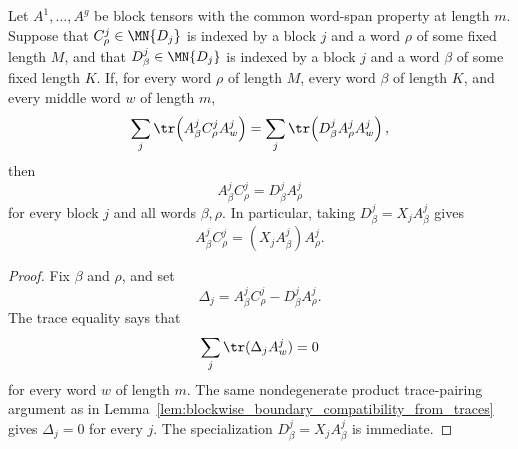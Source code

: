 \begin{lemma}
    \label{lem:blockwise_word_boundary_compatibility_from_traces}
    \leanok
    Let $A^1,\ldots,A^g$ be block tensors with the common word-span property
    at length $m$. Suppose that $C^j_\rho \in \MN{D_j}$ is
    indexed by a block $j$ and a word $\rho$ of some fixed length $M$,
    and that $D^j_\beta \in \MN{D_j}$ is indexed by a block
    $j$ and a word $\beta$ of some fixed length $K$. If, for every
    word $\rho$ of length $M$, every word $\beta$ of length $K$, and
    every middle word $w$ of length $m$,
    \[
        \sum_j\tr\!\left(A^j_\beta C^j_\rho A^j_w\right)
        =
        \sum_j\tr\!\left(D^j_\beta A^j_\rho A^j_w\right),
    \]
    then
    \[
        A^j_\beta C^j_\rho=D^j_\beta A^j_\rho
    \]
    for every block $j$ and all words $\beta,\rho$.  In particular, taking
    $D^j_\beta=X_jA^j_\beta$ gives
    \[
        A^j_\beta C^j_\rho=(X_jA^j_\beta)A^j_\rho .
    \]
\end{lemma}

\begin{proof}
    \leanok
    Fix $\beta$ and $\rho$, and set
    \[
        \Delta_j=A^j_\beta C^j_\rho-D^j_\beta A^j_\rho .
    \]
    The trace equality says that
    \[
        \sum_j\tr(\Delta_jA^j_w)=0
    \]
    for every word $w$ of length $m$.  The same nondegenerate product
    trace-pairing argument as in
    Lemma~\ref{lem:blockwise_boundary_compatibility_from_traces} gives
    $\Delta_j=0$ for every $j$.  The specialization
    $D^j_\beta=X_jA^j_\beta$ is immediate.
\end{proof}

